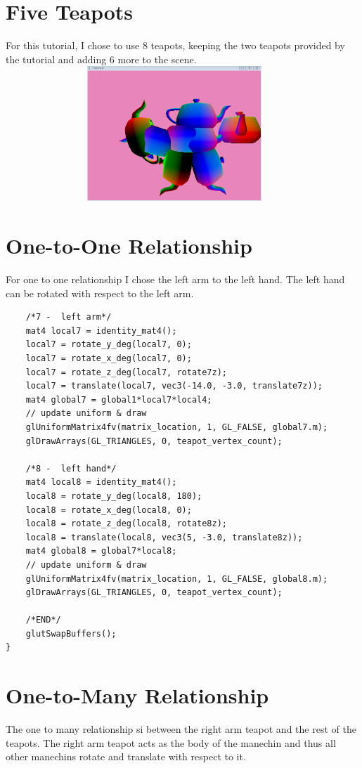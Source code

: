 \documentclass{article}
\begin{document}
\section{Five Teapots}
For this tutorial, I chose to use 8 teapots, keeping the two teapots provided by the tutorial and adding 6 more to the scene.\\
\includegraphics[height=2in,width=5in]{tut41.PNG}



\section{One-to-One Relationship}
For one to one relationship I chose the left arm to the left hand. The left hand can be rotated with respect to the left arm.
\begin{lstlisting}
	/*7 -  left arm*/
	mat4 local7 = identity_mat4();
	local7 = rotate_y_deg(local7, 0);
	local7 = rotate_x_deg(local7, 0);
	local7 = rotate_z_deg(local7, rotate7z);
	local7 = translate(local7, vec3(-14.0, -3.0, translate7z));
	mat4 global7 = global1*local7*local4;
	// update uniform & draw
	glUniformMatrix4fv(matrix_location, 1, GL_FALSE, global7.m);
	glDrawArrays(GL_TRIANGLES, 0, teapot_vertex_count);

	/*8 -  left hand*/
	mat4 local8 = identity_mat4();
	local8 = rotate_y_deg(local8, 180);
	local8 = rotate_x_deg(local8, 0);
	local8 = rotate_z_deg(local8, rotate8z);
	local8 = translate(local8, vec3(5, -3.0, translate8z));
	mat4 global8 = global7*local8;
	// update uniform & draw
	glUniformMatrix4fv(matrix_location, 1, GL_FALSE, global8.m);
	glDrawArrays(GL_TRIANGLES, 0, teapot_vertex_count);

	/*END*/
	glutSwapBuffers();
}
\end{lstlisting}

\section{One-to-Many Relationship}
The one to many relationship si between the right arm teapot and the rest of the teapots. The right arm teapot acts as the body of the manechin and thus all other manechins rotate and translate with respect to it.
\end{document}
